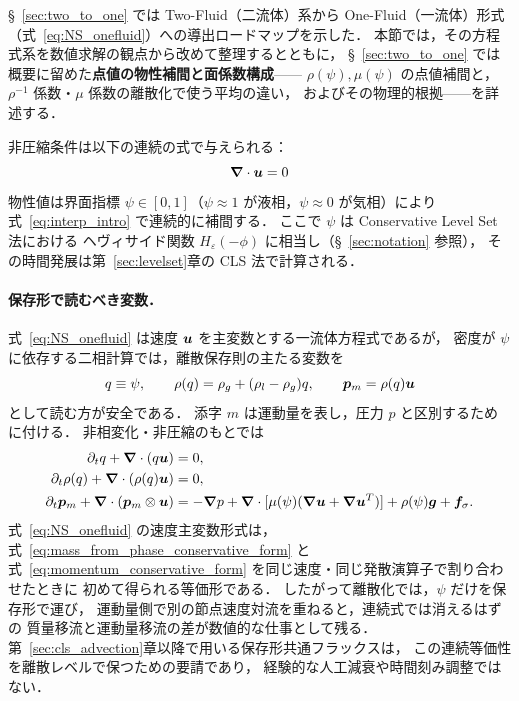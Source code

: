 §~\ref{sec:two_to_one} では Two-Fluid（二流体）系から One-Fluid（一流体）形式（式~\eqref{eq:NS_onefluid}）への導出ロードマップを示した．
本節では，その方程式系を数値求解の観点から改めて整理するとともに，
§~\ref{sec:two_to_one} では概要に留めた\textbf{点値の物性補間と面係数構成}——
$\rho(\psi),\mu(\psi)$ の点値補間と，$\rho^{-1}$ 係数・$\mu$ 係数の離散化で使う平均の違い，
およびその物理的根拠——を詳述する．

非圧縮条件は以下の連続の式で与えられる：
\begin{equation}
  \bm{\nabla} \cdot \bm{u} = 0
\end{equation}
物性値は界面指標 $\psi \in [0,1]$（$\psi \approx 1$ が液相，$\psi \approx 0$ が気相）により
式~\eqref{eq:interp_intro} で連続的に補間する．
ここで $\psi$ は Conservative Level Set 法における
ヘヴィサイド関数 $H_\varepsilon(-\phi)$ に相当し（§~\ref{sec:notation} 参照），
その時間発展は第~\ref{sec:levelset}章の CLS 法で計算される．

\paragraph{保存形で読むべき変数．}
式~\eqref{eq:NS_onefluid} は速度 $\bm{u}$ を主変数とする一流体方程式であるが，
密度が $\psi$ に依存する二相計算では，離散保存則の主たる変数を
\begin{equation}
  q\equiv \psi,\qquad
  \rho(q)=\rho_g+(\rho_l-\rho_g)q,\qquad
  \bm{p}_m=\rho(q)\bm{u}
  \label{eq:conservative_qmp_state}
\end{equation}
として読む方が安全である．
添字 $m$ は運動量を表し，圧力 $p$ と区別するために付ける．
非相変化・非圧縮のもとでは
\begin{align}
  \partial_t q + \bm{\nabla}\cdot(q\bm{u}) &= 0,
  \label{eq:phase_conservative_form} \\
  \partial_t \rho(q)+\bm{\nabla}\cdot(\rho(q)\bm{u}) &= 0,
  \label{eq:mass_from_phase_conservative_form} \\
  \partial_t \bm{p}_m+\bm{\nabla}\cdot(\bm{p}_m\otimes\bm{u})
  &=
  -\bm{\nabla} p+\bm{\nabla}\cdot[\mu(\psi)(\bm{\nabla}\bm{u}+\bm{\nabla}\bm{u}^T)]
  +\rho(\psi)\bm{g}+\bm{f}_\sigma .
  \label{eq:momentum_conservative_form}
\end{align}
式~\eqref{eq:NS_onefluid} の速度主変数形式は，
式~\eqref{eq:mass_from_phase_conservative_form} と
式~\eqref{eq:momentum_conservative_form} を同じ速度・同じ発散演算子で割り合わせたときに
初めて得られる等価形である．
したがって離散化では，$\psi$ だけを保存形で運び，
運動量側で別の節点速度対流を重ねると，連続式では消えるはずの
質量移流と運動量移流の差が数値的な仕事として残る．
第~\ref{sec:cls_advection}章以降で用いる保存形共通フラックスは，
この連続等価性を離散レベルで保つための要請であり，
経験的な人工減衰や時間刻み調整ではない．

